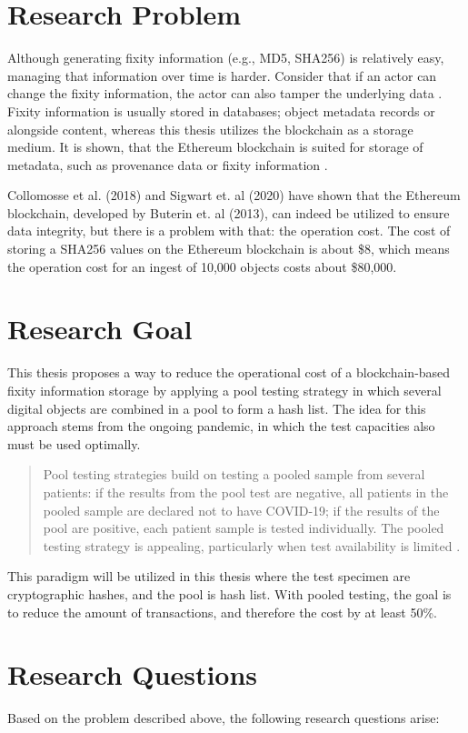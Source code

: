 \documentclass[final]{vutinfth}
\begin{document}
\section{Research Problem}
Although generating fixity information (e.g., MD5, SHA256) is relatively easy, managing that information over time is harder. Consider that if an actor can change the fixity information, the actor can also tamper the underlying data \cite[35]{kirschenbaum2010digital}. Fixity information is usually stored in databases; object metadata records or alongside content, whereas this thesis utilizes the blockchain as a storage medium.
It is shown, that the Ethereum blockchain is suited for storage of metadata, such as provenance data or fixity information \cite[1]{collomosse2018archangel}.

Collomosse et al. (2018) and Sigwart et. al (2020) have shown that the Ethereum blockchain, developed by Buterin et. al (2013), can indeed be utilized to ensure data integrity, but there is a problem with that: the operation cost. The cost of storing a SHA256 values on the Ethereum blockchain is about \$8, which means the operation cost for an ingest of 10,000 objects costs about \$80,000.

\section{Research Goal}
This thesis proposes a way to reduce the operational cost of a blockchain-based fixity information storage by applying a pool testing strategy in which several digital objects are combined in a pool to form a hash list. The idea for this approach stems from the ongoing pandemic, in which the test capacities also must be used optimally.
\begin{quote}
Pool testing strategies build on testing a pooled sample from several patients: if the results from the pool test are negative, all patients in the pooled sample are declared not to have COVID-19; if the results of the pool are positive, each patient sample is tested individually. The pooled testing strategy is appealing, particularly when test availability is limited \cite[1]{cherif2020simulation}.
\end{quote}
This paradigm will be utilized in this thesis where the test specimen are cryptographic hashes, and the pool is hash list. With pooled testing, the goal is to reduce the amount of transactions, and therefore the cost by at least 50\%.

\section{Research Questions}
Based on the problem described above, the following research questions arise:
\end{document}
